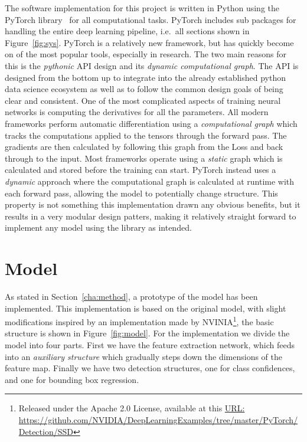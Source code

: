 The software implementation for this project is written in Python using the PyTorch library~\parencite{NEURIPS2019_9015} for all computational tasks.
PyTorch includes sub packages for handling the entire deep learning pipeline, i.e.~all sections shown in Figure~\ref{fig:sys}.
PyTorch is a relatively new framework, but has quickly become on of the most popular tools, especially in research.
The two main reasons for this is the \textit{pythonic} API design and its \textit{dynamic computational graph}.
The API is designed from the bottom up to integrate into the already established python data science ecosystem as well as to follow the common design goals of being clear and consistent.
One of the most complicated aspects of training neural networks is computing the derivatives for all the parameters.
All modern frameworks perform automatic differentiation using a \textit{computational graph} which tracks the computations applied to the tensors through the forward pass.
The gradients are then calculated by following this graph from the Loss and back through to the input.
Most frameworks operate using a \textit{static} graph which is calculated and stored before the training can start.
PyTorch instead uses a \textit{dynamic} approach where the computational graph is calculated at runtime with each forward pass, allowing the model to potentially change structure.
This property is not something this implementation drawn any obvious benefits, but it results in a very modular design patters, making it relatively straight forward to implement any model using the library as intended.  

\section*{Model}
As stated in Section~\ref{cha:method}, a prototype of the model has been implemented.
This implementation is based on the original model, with slight modifications inspired by an implementation made by NVINIA\footnote{Released under the Apache 2.0 License, available at this \href{https://github.com/NVIDIA/DeepLearningExamples/tree/master/PyTorch/Detection/SSD}{URL:} \url{https://github.com/NVIDIA/DeepLearningExamples/tree/master/PyTorch/Detection/SSD}}, the basic structure is shown in Figure~\ref{fig:model}.
For the implementation we divide the model into four parts.
First we have the feature extraction network, which feeds into an \textit{auxiliary structure} which gradually steps down the dimensions of the feature map.
Finally we have two detection structures, one for class confidences, and one for bounding box regression.

